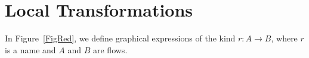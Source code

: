 \chapter{Local Transformations}

\begin{definition}
In Figure~\ref{FigRed}, we define graphical expressions of the kind $r\colon A\to B$, where $r$ is a name and $A$ and $B$ are flows.
\end{definition}

\newcommand{\rwdcd}{{{\mathsf w}{\downarrow}{\hbox{-}}{\mathsf c}{\downarrow}}}
\newcommand{\rwdiu}{{{\mathsf w}{\downarrow}{\hbox{-}}{\mathsf i}{\uparrow  }}}
\newcommand{\rwdwu}{{{\mathsf w}{\downarrow}{\hbox{-}}{\mathsf w}{\uparrow  }}}
\newcommand{\rwdcu}{{{\mathsf w}{\downarrow}{\hbox{-}}{\mathsf c}{\uparrow  }}}
\newcommand{\rcuwu}{{{\mathsf c}{\uparrow  }{\hbox{-}}{\mathsf w}{\uparrow  }}}
\newcommand{\rcdwu}{{{\mathsf c}{\downarrow}{\hbox{-}}{\mathsf w}{\uparrow  }}}
\newcommand{\rcdiu}{{{\mathsf c}{\downarrow}{\hbox{-}}{\mathsf i}{\uparrow  }}}
\newcommand{\rcdcu}{{{\mathsf c}{\downarrow}{\hbox{-}}{\mathsf c}{\uparrow  }}}
\newcommand{\ridwu}{{{\mathsf i}{\downarrow}{\hbox{-}}{\mathsf w}{\uparrow  }}}
\newcommand{\ridcu}{{{\mathsf i}{\downarrow}{\hbox{-}}{\mathsf c}{\uparrow  }}}
